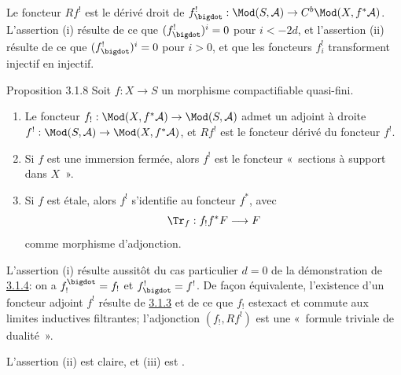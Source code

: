 Le foncteur $Rf^{!}$ est le dérivé droit de
$f^{!}_{\bigdot}:\Mod(S,\mathcal{A})\rightarrow
C^{b}\Mod(X,f^{\ast}\mathcal{A})$. L'assertion (i) résulte de ce que
$(f^{!}_{\bigdot})^{i}=0$ pour $i<-2d$, et l'assertion (ii) résulte de
ce que $(f^{!}_{\bigdot})^{i}=0$ pour $i>0$, et que les foncteurs
$f^{!}_{i}$ transforment injectif en injectif.

\begin{enonce*}{Proposition 3.1.8}
Soit $f:X\rightarrow S$ un morphisme compactifiable quasi-fini.
\begin{enumerate}
\renewcommand{\theenumi}{\roman{enumi}}
\renewcommand{\labelenumi}{(\theenumi)}
\item Le foncteur $f_{!}:\Mod(X,f^{\ast}\mathcal{A})\rightarrow
\Mod(S,\mathcal{A})$ admet un adjoint à droite
$f^{!}:\Mod(S,\mathcal{A})\rightarrow \Mod(X,f^{\ast}\mathcal{A})$, et
$Rf^{!}$ est le foncteur dérivé du foncteur $f^{!}$.

\item Si $f$ est une immersion fermée, alors $f^{!}$ est le foncteur
« sections à support dans $X$ ».

\item Si $f$ est étale, alors $f^{!}$ s'identifie au foncteur
$f^{\ast}$, avec 
$$
\Tr_{f}:f_{!}f^{\ast}F\longrightarrow F
$$
comme morphisme d'adjonction.
\end{enumerate}
\end{enonce*}

L'assertion (i) résulte aussitôt du cas particulier $d=0$ de la
démonstration de \hyperref[XVIII.thm3.1.4]{3.1.4}: on a $f^{\bigdot}_{!}=f_{!}$ et
$f^{!}_{\bigdot}=f^{!}$. De façon équivalente, l'existence d'un
foncteur adjoint $f^{!}$ résulte de \hyperref[XVIII.lem3.1.3]{3.1.3} et de ce que $f_{!}$
est\pageoriginale exact et commute aux limites inductives filtrantes;
l'adjonction $(f_{!},Rf^{!})$ est une « formule triviale de
dualité ».

L'assertion (ii) est claire, et (iii) est .

\setcounter{subsubsection}{8}
